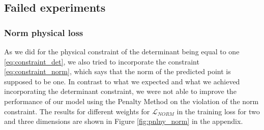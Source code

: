 
\subsection{Failed experiments}

\subsubsection{Norm physical loss}
As we did for the physical constraint of the determinant being equal to one \eqref{eq:constraint_det}, we also tried to incorporate the constraint \eqref{eq:constraint_norm}, which says that the norm of the predicted point is supposed to be one. In contrast to what we expected and what we achieved incorporating the determinant constraint, we were not able to improve the performance of our model using the Penalty Method on the violation of the norm constraint. The results for different weights for $\mathcal{L}_{NORM}$ in the training loss for two and three dimensions are shown in Figure \ref{fig:pnlny_norm} in the appendix.

